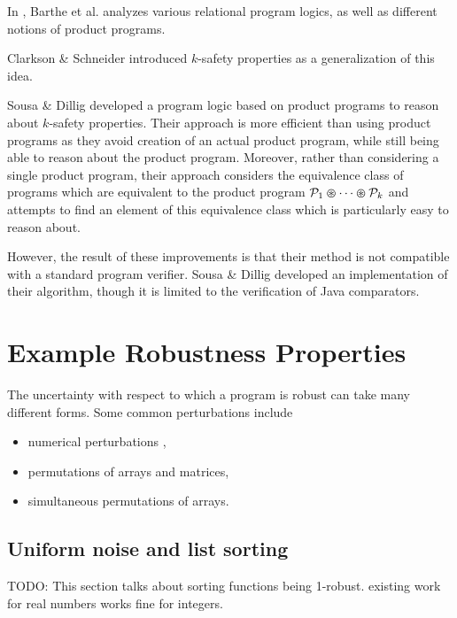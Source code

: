 \documentclass{llncs}
\begin{document}
    In \cite{bartheanalysis}, Barthe et al.
    analyzes various relational program logics, as well as different notions of
    product programs.
    \smallskip

    \space\space Clarkson \& Schneider
    \cite{clarkson08} introduced \(k\)-safety properties as a generalization of this
    idea.

    Sousa \& Dillig \cite{sousa16} developed a program logic based on product programs
    to reason about \(k\)-safety properties.  Their approach is more efficient than
    using product programs as they avoid creation of an actual product program, while
    still being able to reason about the product program.  Moreover, rather than
    considering a single product program, their approach considers the equivalence
    class of programs which are equivalent to the product program
    \(\mathcal{P}_{1} \varoast \dotsb \varoast \mathcal{P}_{k}\) and attempts to
    find an element of this equivalence class which is particularly easy
    to reason about.
    
    However, the result of these improvements is that their method is not compatible
    with a standard program verifier.  Sousa \& Dillig developed
    an implementation of their algorithm, though it is limited to the verification
    of Java comparators.

\section{Example Robustness Properties}

  The uncertainty with respect to which a program is robust can take many
  different forms.  Some common perturbations include
  \begin{itemize}
    \item numerical perturbations \cite{samanta14,chaudhuri10,chaudhuri11},
    \item permutations of arrays and matrices,
    \item simultaneous permutations of arrays.
  \end{itemize}

  \subsection{Uniform noise and list sorting}

    TODO: This section talks about sorting functions being 1-robust. existing
    work for real numbers works fine for integers.
\end{document}
